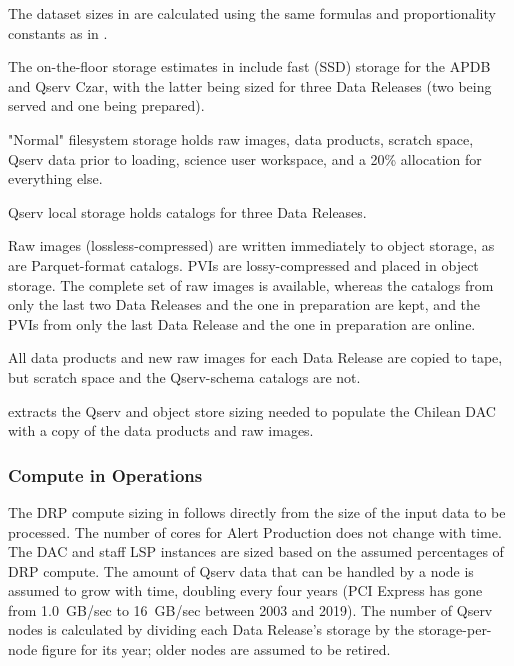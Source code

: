 The dataset sizes in  are calculated using the same formulas and proportionality constants as in .

\afterpage{
  \clearpage
  \begin{landscape}
      
      
      
  \end{landscape}
  \clearpage
}

The on-the-floor storage estimates in  include fast (SSD) storage for the APDB and Qserv Czar, with the latter being sized for three Data Releases (two being served and one being prepared).

"Normal" filesystem storage holds raw images, data products, scratch space, Qserv data prior to loading, science user workspace, and a 20\% allocation for everything else.

Qserv local storage holds catalogs for three Data Releases.

Raw images (lossless-compressed) are written immediately to object storage, as are Parquet-format catalogs.
PVIs are lossy-compressed and placed in object storage.
The complete set of raw images is available, whereas the catalogs from only the last two Data Releases and the one in preparation are kept, and the PVIs from only the last Data Release and the one in preparation are online.

All data products and new raw images for each Data Release are copied to tape, but scratch space and the Qserv-schema catalogs are not.

 extracts the Qserv and object store sizing needed to populate the Chilean DAC with a copy of the data products and raw images.

\subsubsection{Compute in Operations}

The DRP compute sizing in  follows directly from the size of the input data to be processed.
The number of cores for Alert Production does not change with time.
The DAC and staff LSP instances are sized based on the assumed percentages of DRP compute.
The amount of Qserv data that can be handled by a node is assumed to grow with time, doubling every four years (PCI Express has gone from 1.0~GB/sec to 16~GB/sec between 2003 and 2019).
The number of Qserv nodes is calculated by dividing each Data Release's storage by the storage-per-node figure for its year; older nodes are assumed to be retired.
